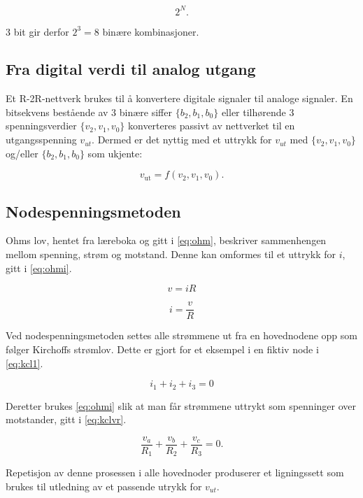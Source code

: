 \documentclass[11pt,a4paper,twocolumn]{article}
\begin{document}
\[
2^N.
\]

3 bit gir derfor \(2^3 = 8\) binære kombinasjoner.

\subsection{Fra digital verdi til analog utgang}

Et R-2R-nettverk brukes til å konvertere digitale signaler til analoge signaler. En bitsekvens bestående av 3 binære siffer $\{b_2, b_1, b_0\}$ eller tilhørende 3 spenningsverdier $\{v_2, v_1, v_0\}$ konverteres passivt av nettverket til en utgangsspenning $v_{ut}$. Dermed er det nyttig med et uttrykk for $v_{ut}$ med $\{v_2, v_1, v_0\}$ og/eller $\{b_2, b_1, b_0\}$ som ukjente:

\[
v_{\mathrm{ut}} = f(v_2,v_1,v_0).
\]

\subsection{Nodespenningsmetoden}

Ohms lov, hentet fra læreboka \cite{laerebok} og gitt i \cref{eq:ohm}, beskriver sammenhengen mellom spenning, strøm og motstand. Denne kan omformes til et uttrykk for $i$, gitt i \cref{eq:ohmi}.

\begin{equation}
\label{eq:ohm}
v = iR
\end{equation}

\begin{equation}
\label{eq:ohmi}
i = \frac{v}{R}
\end{equation}

Ved nodespenningsmetoden settes alle strømmene ut fra en hovednodene opp som følger Kirchoffs strømlov. Dette er gjort for et eksempel i en fiktiv node i \cref{eq:kcl1}.

\begin{equation}
\label{eq:kcl1}
i_1 + i_2 + i_3 = 0
\end{equation}

Deretter brukes \cref{eq:ohmi} slik at man får strømmene uttrykt som spenninger over motstander, gitt i \cref{eq:kclvr}.

\begin{equation}
\label{eq:kclvr}
\frac{v_a}{R_1}
+
\frac{v_b}{R_2}
+
\frac{v_c}{R_3}
= 0.
\end{equation}

Repetisjon av denne prosessen i alle hovednoder produserer et ligningssett som brukes til utledning av et passende utrykk for $v_{ut}$.
\end{document}
